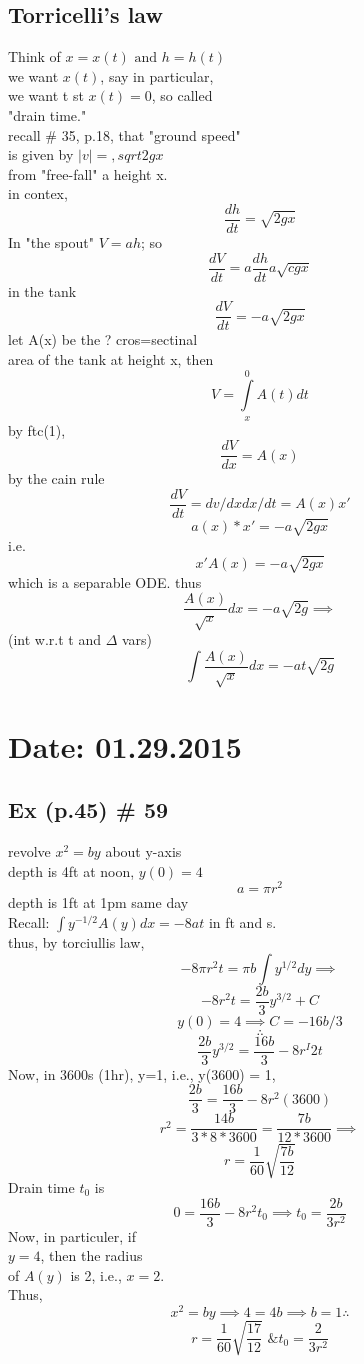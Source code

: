 \documentclass[10pt,a4paper]{article}
\begin{document}
  \subsection*{Torricelli's law}
  Think of $x = x(t) \text{ and } h = h(t)$ \\
  we want $x(t)$, say in particular,  \\
  we want t st $x(t) = 0$, so called  \\
  "drain time." \\
  recall \# 35, p.18, that "ground speed" \\
  is given by $|v|=,sqrt{2gx}$ \\
  from "free-fall" a height x.  \\
  in contex, 
  $$\frac{dh}{dt}= \sqrt{2gx}$$
  In "the spout" $V=ah$; so
  $$\frac{dV}{dt}= a\frac{dh}{dt}a\sqrt{cgx}$$
  in the tank 
  $$\frac{dV}{dt}= -a\sqrt{2gx}$$
  let A(x) be the ? cros=sectinal \\
  area of the tank at height x, then  \\
  $$V= \int\limits_{x}^{0}A(t)dt$$
   by ftc(1),
   $$\frac{dV}{dx}= A(x)$$
   by the cain rule
   $$\frac{dV}{dt}= dv/dx dx/dt = A(x)x'$$
   $$a(x)*x' = -a \sqrt{2gx}$$
   i.e.
   $$x'A(x)= -a\sqrt{2gx}$$
   which is a separable ODE. thus
   $$\frac{A(x)}{\sqrt{x}} dx = -a\sqrt{2g} \implies$$
   (int w.r.t t and $\Delta$ vars)
   $$\int \frac{A(x)}{\sqrt{x}} dx= -at\sqrt{2g}$$

\newpage
{}
\section{Date: 01.29.2015}
  
  \subsection*{Ex (p.45) \# 59} 
  revolve \(x^2 = by\) about y-axis \\	
  depth is 4ft at noon, \(y(0) = 4\)
  \[a = \pi r^2\]
  depth is 1ft at 1pm same day  \\
  Recall: \(\int y^{-1/2} A(y)dx= -8at\) in ft and s. \\
  thus, by torciullis law,  \\
  \[-8 \pi r^2t = \pi b \int y^{1/2}dy \implies \]
  \[-8r^2t = \frac{2b}{3} y^{3/2} + C\]
  \[y(0) = 4 \implies C = -16b/3\]
  \[\therefore\]
  \[\frac{2b}{3} y^{3/2}= \frac{16b}{3}-8 r^I 2t\]
  Now, in 3600s (1hr), y=1, i.e., y(3600) = 1, 
  \[\frac{2b}{3} = \frac{16b}{3}-8r^2(3600)\]
  \[r^2 = \frac{14b}{3*8*3600} = \frac{7b}{12*3600} \implies \]
  \[r = \frac{1}{60} \sqrt{\frac{7b}{12}}\]
  Drain time \(t_0\) is 
  \[0 = \frac{16b}{3} - 8r^2t_0 \implies t_0 = \frac{2b}{3r^2}\]
  Now, in particuler, if  \\
  \( y = 4 \), then the radius  \\
  of \( A(y) \) is 2, i.e., \( x = 2 \). \\ 
  Thus,
  \[x^2 = by \implies 4 = 4b \implies b=1 \therefore\]  
  \[r = \frac{1}{60} \sqrt{\frac{17}{12}}   \text{ \& } t_0 =
  \frac{2}{3r^2}\]
\end{document}
